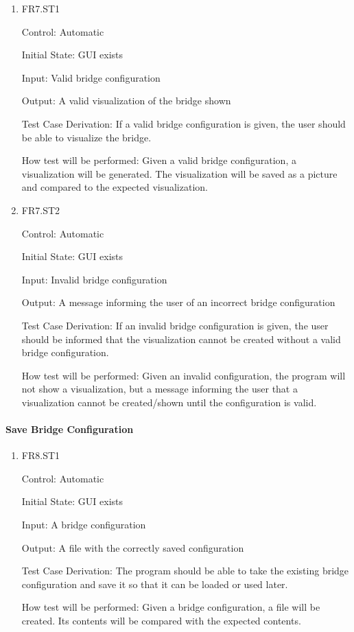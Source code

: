 \documentclass[12pt, titlepage]{article}
\begin{document}
\begin{enumerate}
  
  \item{FR7.ST1\\}
  
  Control: Automatic
  
  Initial State: GUI exists
  
  Input: Valid bridge configuration
  
  Output: A valid visualization of the bridge shown
  
  Test Case Derivation: If a valid bridge configuration is given, the user should be able to
  visualize the bridge.
  
  How test will be performed: Given a valid bridge configuration, a visualization will be generated.
  The visualization will be saved as a picture and compared to the expected visualization.
  
  \item{FR7.ST2\\}
  
  Control: Automatic
  
  Initial State: GUI exists
  
  Input: Invalid bridge configuration
  
  Output: A message informing the user of an incorrect bridge configuration
  
  Test Case Derivation: If an invalid bridge configuration is given, the user should be informed
  that the visualization cannot be created without a valid bridge configuration.
  
  How test will be performed: Given an invalid configuration, the program will not show
  a visualization, but a message informing the user that a visualization cannot be created/shown
  until the configuration is valid.
  
\end{enumerate}

\paragraph{Save Bridge Configuration}

\begin{enumerate}

  \item{FR8.ST1\\}
  
  Control: Automatic
  
  Initial State: GUI exists
  
  Input: A bridge configuration
  
  Output: A file with the correctly saved configuration
  
  Test Case Derivation: The program should be able to take the existing bridge configuration and
  save it so that it can be loaded or used later.
  
  How test will be performed: Given a bridge configuration, a file will be created. Its contents
  will be compared with the expected contents.

\end{enumerate}
\end{document}
